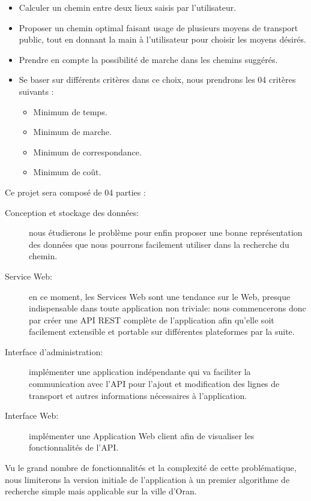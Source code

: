 \begin{itemize}
	\item Calculer un chemin entre deux lieux saisis par l'utilisateur.
	\item Proposer un chemin optimal faisant usage de plusieurs moyens de transport public, tout en donnant la main à l'utilisateur pour choisir les moyens désirés.
	\item Prendre en compte la possibilité de marche dans les chemins suggérés.
	\item Se baser sur différents critères dans ce choix, nous prendrons les 04 critères suivants : 
	\begin{itemize}
		\item Minimum de temps.
		\item Minimum de marche.
		\item Minimum de correspondance.
		\item Minimum de coût.\newline
	\end{itemize}	 
\end{itemize}
Ce projet sera composé de 04 parties :\newline
\begin{description}
	\item[Conception et stockage des données: ] nous étudierons le problème pour enfin proposer une bonne représentation des données que nous pourrons facilement utiliser dans la recherche du chemin.

	\item[Service Web: ] en ce moment, les Services Web sont une tendance sur le Web, presque indispensable dans toute application non triviale: nous commencerons donc par créer une API REST complète de l'application afin qu'elle soit facilement extensible et portable sur différentes plateformes par la suite.
	
	\item[Interface d'administration: ] implémenter une application indépendante qui va faciliter la  communication avec l'API pour l'ajout et modification des lignes de transport et autres informations nécessaires à l'application.
	
	
	\item[Interface Web: ] implémenter une Application Web client afin de visualiser les fonctionnalités de l'API.
\end{description}

Vu le grand nombre de fonctionnalités et la complexité de cette problématique, nous limiterons la version initiale de l'application à un premier algorithme de recherche simple mais applicable sur la ville d'Oran.

